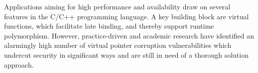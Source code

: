 
% 


Applications aiming for high performance and availability draw on several features in the C/C++ programming language. 
A key building block are virtual functions, which facilitate late binding, and thereby support runtime polymorphism. 
However, practice-driven and academic research have identified an alarmingly high number of virtual pointer corruption 
vulnerabilities which undercut security in significant ways and are still in need of a thorough solution approach.

